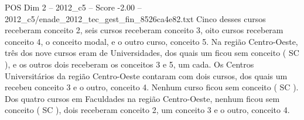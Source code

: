 \begin{textsample}{POS Dim 2 – 2012\_c5 – Score -2.00 – 2012\_c5/enade\_2012\_tec\_gest\_fin\_8526ca4e82.txt}
Cinco desses cursos receberam conceito 2, seis cursos receberam conceito 3, oito cursos receberam conceito 4, o conceito modal, e o outro curso, conceito 5.
Na região Centro-Oeste, três dos nove cursos eram de Universidades, dos quais um ficou sem conceito ( SC ), e os outros dois receberam os conceitos 3 e 5, um cada.
Os Centros Universitários da região Centro-Oeste contaram com dois cursos, dos quais um recebeu conceito 3 e o outro, conceito 4.
Nenhum curso ficou sem conceito ( SC ).
Dos quatro cursos em Faculdades na região Centro-Oeste, nenhum ficou sem conceito ( SC ), dois receberam conceito 2, um conceito 3 e o outro, conceito 4.

\end{textsample}
